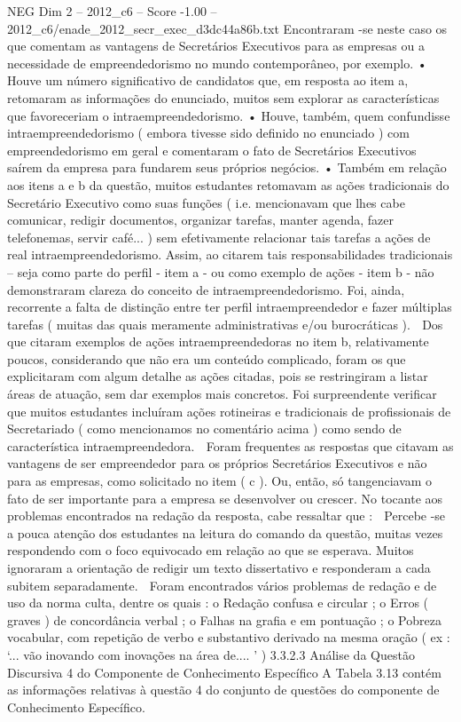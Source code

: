 \begin{textsample}{NEG Dim 2 – 2012\_c6 – Score -1.00 – 2012\_c6/enade\_2012\_secr\_exec\_d3dc44a86b.txt}
Encontraram -se neste caso os que comentam as vantagens de Secretários Executivos para as empresas ou a necessidade de empreendedorismo no mundo contemporâneo, por exemplo. • Houve um número significativo de candidatos que, em resposta ao item a, retomaram as informações do enunciado, muitos sem explorar as características que favoreceriam o intraempreendedorismo. • Houve, também, quem confundisse intraempreendedorismo ( embora tivesse sido definido no enunciado ) com empreendedorismo em geral e comentaram o fato de Secretários Executivos saírem da empresa para fundarem seus próprios negócios. • Também em relação aos itens a e b da questão, muitos estudantes retomavam as ações tradicionais do Secretário Executivo como suas funções ( i.e. mencionavam que lhes cabe comunicar, redigir documentos, organizar tarefas, manter agenda, fazer telefonemas, servir café... ) sem efetivamente relacionar tais tarefas a ações de real intraempreendedorismo.
Assim, ao citarem tais responsabilidades tradicionais – seja como parte do perfil - item a - ou como exemplo de ações - item b - não demonstraram clareza do conceito de intraempreendedorismo.
Foi, ainda, recorrente a falta de distinção entre ter perfil intraempreendedor e fazer múltiplas tarefas ( muitas das quais meramente administrativas e/ou burocráticas ).  Dos que citaram exemplos de ações intraempreendedoras no item b, relativamente poucos, considerando que não era um conteúdo complicado, foram os que explicitaram com algum detalhe as ações citadas, pois se restringiram a listar áreas de atuação, sem dar exemplos mais concretos.
Foi surpreendente verificar que muitos estudantes incluíram ações rotineiras e tradicionais de profissionais de Secretariado ( como mencionamos no comentário acima ) como sendo de característica intraempreendedora.  Foram frequentes as respostas que citavam as vantagens de ser empreendedor para os próprios Secretários Executivos e não para as empresas, como solicitado no item ( c ).
Ou, então, só tangenciavam o fato de ser importante para a empresa se desenvolver ou crescer.
No tocante aos problemas encontrados na redação da resposta, cabe ressaltar que :  Percebe -se a pouca atenção dos estudantes na leitura do comando da questão, muitas vezes respondendo com o foco equivocado em relação ao que se esperava.
Muitos ignoraram a orientação de redigir um texto dissertativo e responderam a cada subitem separadamente.  Foram encontrados vários problemas de redação e de uso da norma culta, dentre os quais : o Redação confusa e circular ; o Erros ( graves ) de concordância verbal ; o Falhas na grafia e em pontuação ; o Pobreza vocabular, com repetição de verbo e substantivo derivado na mesma oração ( ex : ‘... vão inovando com inovações na área de.... ’ ) 3.3.2.3 Análise da Questão Discursiva 4 do Componente de Conhecimento Específico A Tabela 3.13 contém as informações relativas à questão 4 do conjunto de questões do componente de Conhecimento Específico.

\end{textsample}
